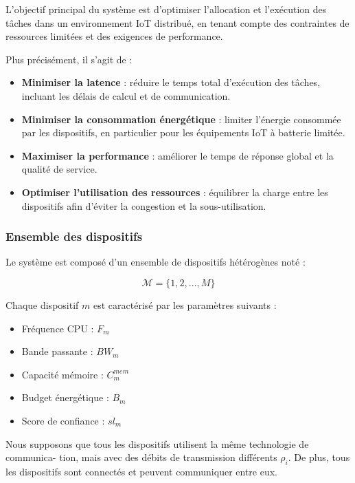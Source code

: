 \documentclass[12pt,a4paper]{report}
\begin{document}
L’objectif principal du système est d’optimiser l’allocation et l’exécution des tâches dans un environnement IoT distribué, en tenant compte des contraintes de ressources limitées et des exigences de performance.

Plus précisément, il s’agit de :

\begin{itemize}
    \item \textbf{Minimiser la latence} : réduire le temps total d’exécution des tâches, incluant les délais de calcul et de communication.
    \item \textbf{Minimiser la consommation énergétique} : limiter l’énergie consommée par les dispositifs, en particulier pour les équipements IoT à batterie limitée.
    \item \textbf{Maximiser la performance} : améliorer le temps de réponse global et la qualité de service.
    \item \textbf{Optimiser l’utilisation des ressources} : équilibrer la charge entre les dispositifs afin d’éviter la congestion et la sous-utilisation.
\end{itemize}

\subsubsection{Ensemble des dispositifs}

Le système est composé d’un ensemble de dispositifs hétérogènes noté :

\begin{equation}
\mathcal{M} = \{1, 2, ..., M\}
\end{equation}

Chaque dispositif $m$ est caractérisé par les paramètres suivants :

\begin{itemize}
    \item Fréquence CPU : $F_m$
    \item Bande passante : $BW_m$
    \item Capacité mémoire : $C^{mem}_m$
    \item Budget énergétique : $B_m$
    \item Score de confiance : $sl_m$
\end{itemize}
Nous supposons que tous les dispositifs utilisent la même technologie de communica-
tion, mais avec des débits de transmission différents $\rho_i$. De plus, tous les dispositifs sont connectés et peuvent communiquer entre eux.
\end{document}

